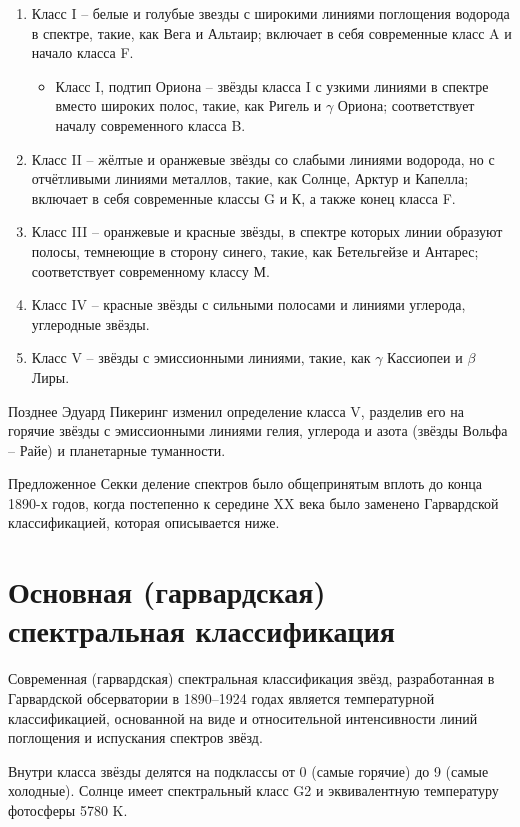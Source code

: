 \documentclass[12pt,a4paper]{article}
\begin{document}
\begin{enumerate}
\item Класс I -- белые и голубые звезды с широкими линиями поглощения водорода в спектре, такие, как Вега и Альтаир; включает в себя современные класс A и начало класса F.
\begin{itemize}
\item Класс I, подтип Ориона -- звёзды класса I с узкими линиями в спектре вместо широких полос, такие, как Ригель и $\gamma$ Ориона; соответствует началу современного класса B.
\end{itemize}
\item Класс II -- жёлтые и оранжевые звёзды со слабыми линиями водорода, но с отчётливыми линиями металлов, такие, как Солнце, Арктур и Капелла; включает в себя современные классы G и К, а также конец класса F.
\item Класс III -- оранжевые и красные звёзды, в спектре которых линии образуют полосы, темнеющие в сторону синего, такие, как Бетельгейзе и Антарес; соответствует современному классу М.
\item Класс IV -- красные звёзды с сильными полосами и линиями углерода, углеродные звёзды.
\item Класс V -- звёзды с эмиссионными линиями, такие, как $\gamma$ Кассиопеи и $\beta$ Лиры.

\end{enumerate}






Позднее Эдуард Пикеринг изменил определение класса V, разделив его на горячие звёзды с эмиссионными линиями гелия, углерода и азота (звёзды Вольфа -- Райе) и планетарные туманности\cite{6}.

Предложенное Секки деление спектров было общепринятым вплоть до конца 1890-х годов, когда постепенно к середине XX века было заменено Гарвардской классификацией, которая описывается ниже\cite{6}\cite{7}.

\section{Основная (гарвардская) спектральная классификация}

Современная (гарвардская) спектральная классификация звёзд, разработанная в Гарвардской обсерватории в 1890--1924 годах является температурной классификацией, основанной на виде и относительной интенсивности линий поглощения и испускания спектров звёзд.

Внутри класса звёзды делятся на подклассы от 0 (самые горячие) до 9 (самые холодные). Солнце имеет спектральный класс G2 и эквивалентную температуру фотосферы 5780 K\cite{11}.
\end{document}
